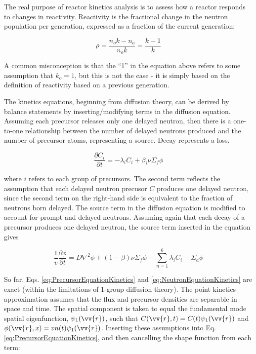 \documentclass[10pt]{article}
\begin{document}
\begin{flushleft}
The real purpose of reactor kinetics analysis is to assess how a reactor responds to changes in reactivity. Reactivity is the fractional change in the neutron population per generation, expressed as a fraction of the current generation:

\begin{equation}
\label{eq:Reactivity}
\rho=\frac{n_ok-n_o}{n_ok}=\frac{k-1}{k}
\end{equation}

A common misconception is that the ``1'' in the equation above refers to some assumption that \(k_o=1\), but this is not the case - it is simply based on the definition of reactivity based on a previous generation.

The kinetics equations, beginning from diffusion theory, can be derived by balance statements by inserting/modifying terms in the diffusion equation. Assuming each precursor releases only one delayed neutron, then there is a one-to-one relationship between the number of delayed neutrons produced and the number of precursor atoms, representing a source. Decay represents a loss. 

\begin{equation}
\label{eq:PrecursorEquationKinetics}
\frac{\partial C_i}{\partial t}=-\lambda_i C_i + \beta_i \nu\Sigma_f\phi
\end{equation} 

where \(i\) refers to each group of precursors. The second term reflects the assumption that each delayed neutron precusor \(C\) produces one delayed neutron, since the second term on the right-hand side is equivalent to the fraction of neutrons born delayed. The source term in the diffusion equation is modified to account for prompt and delayed neutrons. Assuming again that each decay of a precursor produces one delayed neutron, the source term inserted in the equation gives

\begin{equation}
\label{eq:NeutronEquationKinetics}
\frac{1}{v}\frac{\partial\phi}{\partial t}=D\nabla^2\phi + (1-\beta)\nu\Sigma_f\phi + \sum_{n=1}^{6} \lambda_i C_i -\Sigma_a\phi
\end{equation} 

So far, Eqs. \ref{eq:PrecursorEquationKinetics} and \ref{eq:NeutronEquationKinetics} are exact (within the limitations of 1-group diffusion theory). The point kinetics approximation assumes that the flux and precursor densities are separable in space and time. The spatial component is taken to equal the fundamental mode spatial eigenfunction, \(\psi_1(\vv{r})\), such that \(C(\vv{r},t) = C(t)\psi_1(\vv{r})\) and \(\phi(\vv{r},x)=vn(t)\psi_1(\vv{r})\). Inserting these assumptions into Eq. \ref{eq:PrecursorEquationKinetics}, and then cancelling the shape function from each term:


\end{flushleft}
\end{document}

